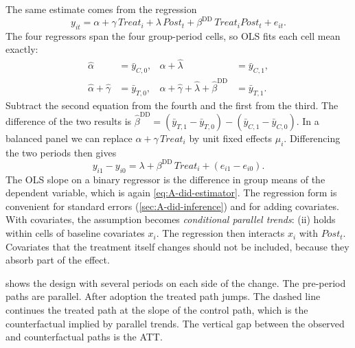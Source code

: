 The same estimate comes from the regression
\begin{equation}\label{eq:A-did-reg}
y_{it}=\alpha+\gamma\,\mathit{Treat}_i+\lambda\,\mathit{Post}_t+\beta^{\mathrm{DD}}\,\mathit{Treat}_i\mathit{Post}_t+e_{it}.
\end{equation}
The four regressors span the four group-period cells, so OLS fits each cell mean exactly:
\begin{align*}
\hat\alpha&=\bar y_{C,0}, & \hat\alpha+\hat\lambda&=\bar y_{C,1},\\
\hat\alpha+\hat\gamma&=\bar y_{T,0}, & \hat\alpha+\hat\gamma+\hat\lambda+\hat\beta^{\mathrm{DD}}&=\bar y_{T,1}.
\end{align*}
Subtract the second equation from the fourth and the first from the third. The difference of the two results is
$\hat\beta^{\mathrm{DD}}=(\bar y_{T,1}-\bar y_{T,0})-(\bar y_{C,1}-\bar y_{C,0})$. In a balanced panel we can
replace $\alpha+\gamma\,\mathit{Treat}_i$ by unit fixed effects $\mu_i$. Differencing the two periods then gives
\begin{equation*}
y_{i1}-y_{i0}=\lambda+\beta^{\mathrm{DD}}\,\mathit{Treat}_i+(e_{i1}-e_{i0}).
\end{equation*}
The OLS slope on a binary regressor is the difference in group means of the dependent variable, which is again
\eqref{eq:A-did-estimator}. The regression form is convenient for standard errors (\cref{sec:A-did-inference}) and for
adding covariates. With covariates, the assumption becomes \emph{conditional parallel trends}: (ii) holds within
cells of baseline covariates $x_i$. The regression then interacts $x_i$ with $\mathit{Post}_t$. Covariates that the
treatment itself changes should not be included, because they absorb part of the effect.

 shows the design with several periods on each side of the change. The pre-period paths are
parallel. After adoption the treated path jumps. The dashed line continues the treated path at the slope of the
control path, which is the counterfactual implied by parallel trends. The vertical gap between the observed and
counterfactual paths is the ATT.

